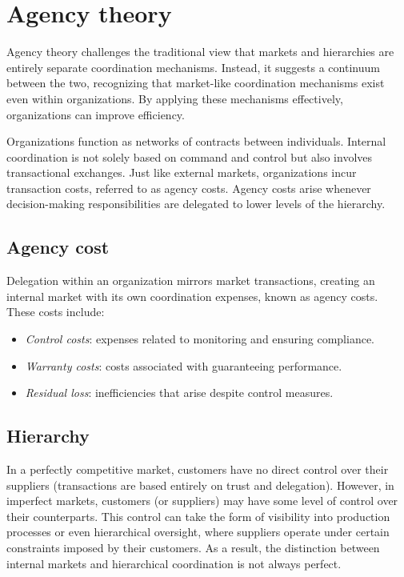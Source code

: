\section{Agency theory}

Agency theory challenges the traditional view that markets and hierarchies are entirely separate coordination mechanisms. 
Instead, it suggests a continuum between the two, recognizing that market-like coordination mechanisms exist even within organizations. 
By applying these mechanisms effectively, organizations can improve efficiency.

Organizations function as networks of contracts between individuals.
Internal coordination is not solely based on command and control but also involves transactional exchanges.
Just like external markets, organizations incur transaction costs, referred to as agency costs.
Agency costs arise whenever decision-making responsibilities are delegated to lower levels of the hierarchy.

\subsection{Agency cost}
Delegation within an organization mirrors market transactions, creating an internal market with its own coordination expenses, known as agency costs. 
These costs include:
\begin{itemize}
    \item \textit{Control costs}: expenses related to monitoring and ensuring compliance.
    \item \textit{Warranty costs}: costs associated with guaranteeing performance.
    \item \textit{Residual loss}: inefficiencies that arise despite control measures.
\end{itemize}

\subsection{Hierarchy}
In a perfectly competitive market, customers have no direct control over their suppliers (transactions are based entirely on trust and delegation). 
However, in imperfect markets, customers (or suppliers) may have some level of control over their counterparts. 
This control can take the form of visibility into production processes or even hierarchical oversight, where suppliers operate under certain constraints imposed by their customers.
As a result, the distinction between internal markets and hierarchical coordination is not always perfect. 

